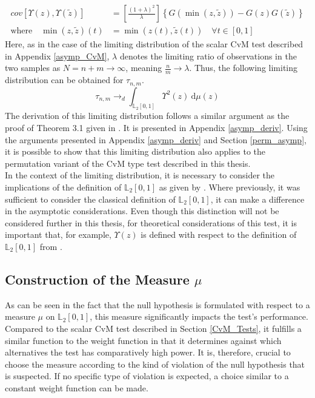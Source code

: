 \documentclass[12pt, a4paper]{article}
\theoremstyle{MAstyle} \newtheorem{assumption}{Assumption}[section]
\theoremstyle{MAstyle} \newtheorem{definition}{Definition}[section]
\theoremstyle{MAstyle} \newtheorem{theorem}{Theorem}[section]
\begin{document}
			\begin{equation}\label{cov_func}
				\begin{split}
					\textit{cov}\left[\Upsilon(z), \Upsilon(\tilde{z})\right] &= \left[\frac{(1 + \lambda)^2}{\lambda}\right]\left\{G(\min\left(z, \tilde{z}\right)) - G(z)G(\tilde{z})\right\} \\
					\text{where} \quad \min(z, \tilde{z})(t) &= \min\left(z(t), \tilde{z}(t)\right) \quad \forall t \in [0,1]
				\end{split}
			\end{equation}
			Here, as in the case of the limiting distribution of the scalar CvM test described in Appendix \ref{asymp_CvM}, $\lambda$ denotes the limiting ratio of observations in the two samples as $N = n+m \rightarrow \infty$, meaning $\frac{n}{m} \rightarrow \lambda$. 
			Thus, the following limiting distribution can be obtained for $\tau_{n,m}$.
			\begin{equation}
				\tau_{n,m} \rightarrow_d \int_{\mathbb{L}_2[0,1]}\Upsilon^2(z) \ \mathrm{d}\mu(z)
			\end{equation}
			The derivation of this limiting distribution follows a similar argument as the proof of Theorem 3.1 given in \cite{bugni_goodness--fit_2009}. It is presented  in Appendix \ref{asymp_deriv}. Using the arguments presented in Appendix \ref{asymp_deriv} and Section \ref{perm_asymp}, it is possible to show that this limiting distribution also applies to the permutation variant of the CvM type test described in this thesis.\\
			
			In the context of the limiting distribution, it is necessary to consider the implications of the definition of $\mathbb{L}_2[0,1]$ as given by \cite{bugni_permutation_2021}.  Where previously, it was sufficient to consider the classical definition of $\mathbb{L}_2[0,1]$, it can make a difference in the asymptotic considerations. Even though this distinction will not be considered further in this thesis, for theoretical considerations of this test, it is important that, for example, $\Upsilon(z)$ is defined with respect to the definition of $\mathbb{L}_2[0,1]$ from \cite{bugni_permutation_2021}.
		
		\subsection{Construction of the Measure $\mu$}\label{mu}
			As can be seen in the fact that the null hypothesis is formulated with respect to a measure $\mu$ on $\mathbb{L}_2[0,1]$, this measure significantly impacts the test's performance. Compared to the scalar CvM test described in Section \ref{CvM_Tests}, it fulfills a similar function to the weight function in that it determines against which alternatives the test has comparatively high power. It is, therefore, crucial to choose the measure according to the kind of violation of the null hypothesis that is suspected. If no specific type of violation is expected, a choice similar to a constant weight function can be made.\\
			
\end{document}
